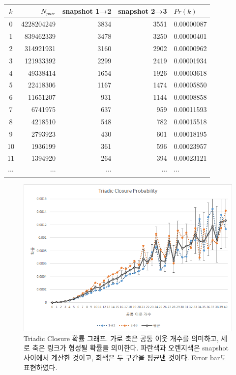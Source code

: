 \documentclass[10pt, a4paper, titlepage]{article}
\begin{document}
\begin{longtable}{|c|r|r|r|l|}

\hline
\rowcolor[gray]{0.8}
$k$ & 
$N_{pair}$ & 
snapshot 1→2 &
snapshot 2→3 & 
$Pr(k)$ \\ \hline
0 & 
4228204249 & 
3834 &
3551 & 
0.00000087 \\ \hline
1 & 
839462339 & 
3478 &
3250 & 
0.00000401 \\ \hline
2 & 
314921931 & 
3160 &
2902 & 
0.00000962 \\ \hline
3 & 
121933392 & 
2299 &
2419 & 
0.00001934 \\ \hline
4 & 
49338414 & 
1654 &
1926 & 
0.00003618 \\ \hline
5 & 
22418306 & 
1167 &
1474 & 
0.00005850 \\ \hline
6 & 
11651207 & 
931 &
1144 & 
0.00008858 \\ \hline
7 & 
6741975 & 
637 &
959 & 
0.00011593 \\ \hline
8 & 
4218510 & 
548 &
782 & 
0.00015518 \\ \hline
9 & 
2793923 & 
430 &
601 & 
0.00018195 \\ \hline
10 & 
1936199 & 
361 &
596 & 
0.00023957 \\ \hline
11 & 
1394920 & 
264 &
394 & 
0.00023121 \\ \hline

$\cdots$ & 
$\cdots$ & 
$\cdots$ & 
$\cdots$ & 
$\cdots$  \\ \hline
\end{longtable}

\begin{figure}
\includegraphics[width=\textwidth]{image14}
\caption{Triadic Closure 확률 그래프. 가로 축은 공통 이웃 개수를 의미하고, 세로 축은 링크가 형성될 확률을 의미한다. 파란색과 오렌지색은 snapshot 사이에서 계산한 것이고, 회색은 두 구간을 평균낸 것이다. Error bar도 표현하였다.}
\label{fig:triadic}
\end{figure}
\end{document}
